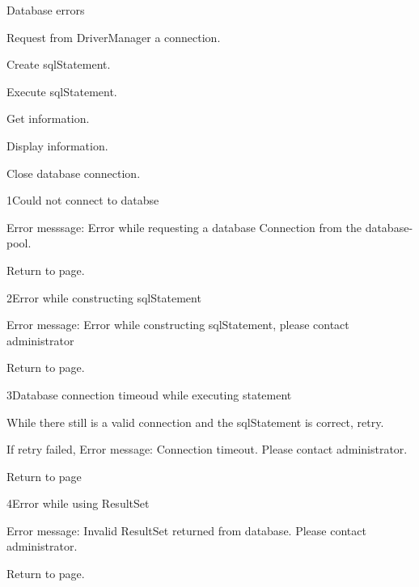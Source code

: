 \begin{uc}{Database errors}


    \begin{uc-mss}
    \item Request from DriverManager a connection.
    \item Create sqlStatement.
    \item Execute sqlStatement.
    \item Get information.
    \item Display information.
    \item Close database connection.
    \end{uc-mss}

    \begin{uc-ext}

        \begin{uc-fail}{1}{Could not connect to databse}
        \item Error messsage: Error while requesting a database Connection from the database-pool.
        \item Return to page.
        \end{uc-fail}
        
        \begin{uc-fail}{2}{Error while constructing sqlStatement}
        \item Error message: Error while constructing sqlStatement, please contact administrator
        \item Return to page.
        \end{uc-fail}
        
        \begin{uc-fail}{3}{Database connection timeoud while executing statement}
        \item While there still is a valid connection and the sqlStatement is correct, retry.
        \item If retry failed, Error message: Connection timeout. Please contact administrator.
        \item Return to page
        \end{uc-fail}
        
        \begin{uc-fail}{4}{Error while using ResultSet}
        \item Error message: Invalid ResultSet returned from database. Please contact administrator.
        \item Return to page.
        \end{uc-fail}
        

\end{uc-ext}
\end{uc}
